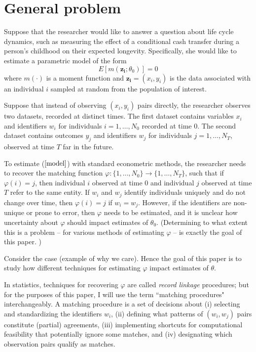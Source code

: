 \documentclass[12pt]{article}
\begin{document}
\section{General problem}
Suppose that the researcher would like to answer a question about life cycle dynamics, such as measuring the effect of a conditional cash transfer during a person's childhood on their expected longevity.  Specifically, she would like to estimate a parametric model of the form
\begin{equation} E[m(\mathbf{z_i}; \theta_0)] = 0 \label{model} \end{equation}
where $m(\cdot)$ is a moment function and $\mathbf{z_i} = (x_i, y_i)$ is the data associated with an individual $i$ sampled at random from the population of interest.  

Suppose that instead of observing $(x_i, y_i)$ pairs directly, the researcher observes two datasets, recorded at distinct times.  The first dataset contains variables $x_i$ and identifiers $w_i$ for individuals $i = 1, \dots, N_0$ recorded at time 0.  The second dataset contains outcomes $y_j$ and identifiers $w_j$ for individuals $j=1,\dots, N_T$, observed at time $T$ far in the future.  

To estimate ($\ref{model}$) with standard econometric methods, the researcher needs to recover the matching function $\varphi: \{1,\dots, N_0\} \to \{1,\dots, N_T\}$, such that if $\varphi(i) = j$, then individual $i$ observed at time 0 and individual $j$ observed at time $T$ refer to the same entity.  If $w_i$ and $w_j$ identify individuals uniquely and do not change over time, then $\varphi(i) = j$ if $w_i = w_j$.  However, if the identifiers are non-unique or prone to error, then $\varphi$ needs to be estimated, and it is unclear how uncertainty about $\varphi$ should impact estimates of $\theta_0$.  (Determining to what extent this is a problem -- for various methods of estimating $\varphi$ -- is exactly the goal of this paper. )  

Consider the case (example of why we care).  Hence the goal of this paper is to study how different techniques for estimating $\varphi$ impact estimates of $\theta$.  

In statistics, techniques for recovering $\varphi$ are called \textit{record linkage} procedures; but for the purposes of this paper, I will use the term ``matching procedures" interchangeably.   A matching procedure is a set of decisions about (i) selecting and standardizing the identifiers $w_i$, (ii) defining what patterns of $(w_i,w_j)$ pairs constitute (partial) agreements, (iii) implementing shortcuts for computational feasibility that potentially ignore some matches, and (iv) designating which observation pairs qualify as matches. 
\end{document}
